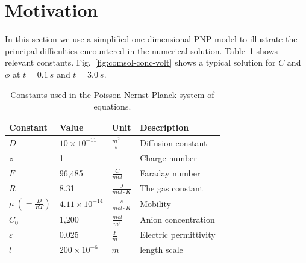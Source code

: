\section{Motivation} \label{sec:moti}

In this section we use a simplified one-dimensional PNP model to illustrate the 
principal difficulties encountered in the numerical solution. Table~\ref{Table:used-constants} 
shows relevant constants. Fig.~\ref{fig:comsol-conc-volt} shows a typical solution for $C$ and $\phi$
at $t=0.1\ s$ and $t=3.0\ s$. 

\begin{table}[!ht]
\caption{Constants used in the Poisson-Nernst-Planck system of equations.}
\centering
\label{Table:used-constants}
{
\begin{tabular}{llll}
  \hline \hline
  Constant&Value&Unit&Description\\
  \hline
  $D$&$10\times10^{-11}$&$\frac{m^2}{s}$&Diffusion constant\\
  $z$&1&-&Charge number\\
  $F$&96,485&$\frac{C}{mol}$&Faraday number\\
  $R$&8.31&$\frac{J}{mol\cdot K}$&The gas constant\\
  $\mu\ \left( = \frac{D}{RT}\right)$&$4.11\times 10^{-14}$&$\frac{s}{mol\cdot K}$&Mobility\\
  $C_{0}$&1,200&$\frac{mol}{m^3}$&Anion concentration\\
  $\varepsilon$&0.025&$\frac{F}{m}$&Electric permittivity\\
  $l$&$200\times10^{-6}$&$m$& length scale\\
  \hline
  \hline
\end{tabular}
}
\end{table}

\noindent

